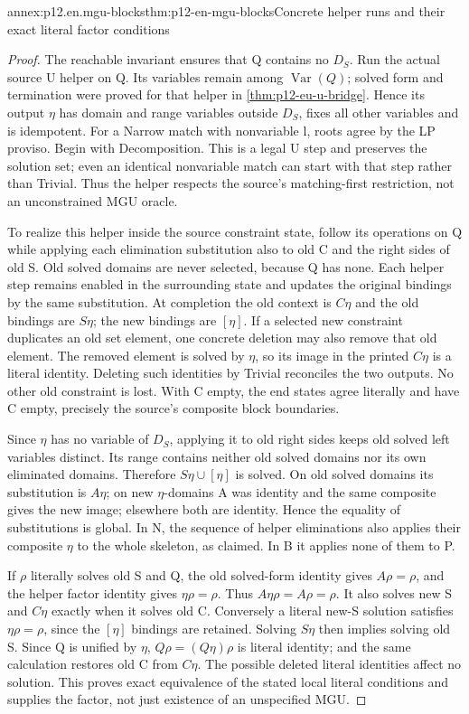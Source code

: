 \begin{annexitem}{annex:p12.en.mgu-blocks}{thm:p12-en-mgu-blocks}{Concrete helper runs and their exact literal factor conditions}
\begin{proof}
The reachable invariant ensures that Q contains no \(D_S\).
Run the actual source U helper on Q. Its variables remain among
\(\operatorname{Var}(Q)\); solved form and termination were proved
for that helper in \cref{thm:p12-eu-u-bridge}. Hence its output
\(\eta\) has domain and range variables outside \(D_S\), fixes
all other variables and is idempotent. For a Narrow match with
nonvariable l, roots agree by the LP proviso. Begin with Decomposition.
This is a legal U step and preserves the solution set; even an
identical nonvariable match can start with that step rather than
Trivial. Thus the helper respects the source's matching-first
restriction, not an unconstrained MGU oracle.

To realize this helper inside the source constraint state, follow
its operations on Q while applying each elimination substitution
also to old C and the right sides of old S. Old solved domains
are never selected, because Q has none. Each helper step remains
enabled in the surrounding state and updates the original bindings
by the same substitution. At completion the old context is
\(C\eta\) and the old bindings are \(S\eta\); the new bindings
are \([\eta]\). If a selected new constraint duplicates an old
set element, one concrete deletion may also remove that old
element. The removed element is solved by \(\eta\), so its
image in the printed \(C\eta\) is a literal identity. Deleting
such identities by Trivial reconciles the two outputs. No other
old constraint is lost. With C empty, the end states agree
literally and have C empty, precisely the source's composite
block boundaries.

Since \(\eta\) has no variable of \(D_S\), applying it to old
right sides keeps old solved left variables distinct. Its range
contains neither old solved domains nor its own eliminated domains.
Therefore \(S\eta\cup[\eta]\) is solved. On old solved
domains its substitution is \(A\eta\); on new \(\eta\)-domains
A was identity and the same composite gives the new image;
elsewhere both are identity. Hence the equality of substitutions
is global. In N, the sequence of helper eliminations also applies
their composite \(\eta\) to the whole skeleton, as claimed.
In B it applies none of them to P.

If \(\rho\) literally solves old S and Q, the old solved-form
identity gives \(A\rho=\rho\), and the helper factor identity
gives \(\eta\rho=\rho\). Thus
\(A\eta\rho=A\rho=\rho\). It also solves new S and
\(C\eta\) exactly when it solves old C. Conversely a literal
new-S solution satisfies \(\eta\rho=\rho\), since the
\([\eta]\) bindings are retained. Solving \(S\eta\) then
implies solving old S. Since Q is unified by \(\eta\),
\(Q\rho=(Q\eta)\rho\) is literal identity; and the same
calculation restores old C from \(C\eta\). The possible
deleted literal identities affect no solution. This proves exact
equivalence of the stated local literal conditions and supplies
the factor, not just existence of an unspecified MGU.


\end{proof}
\end{annexitem}
